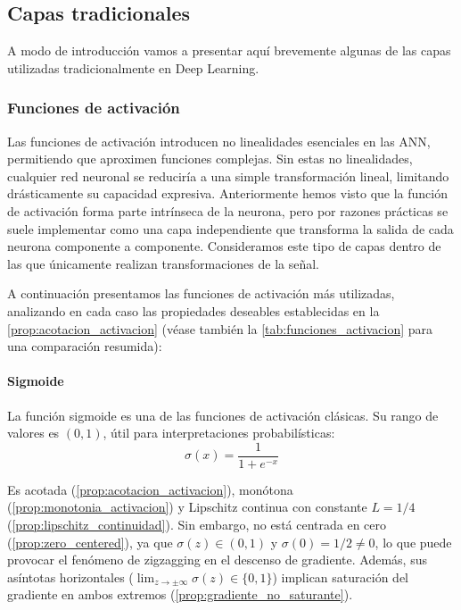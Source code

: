 \subsection{Capas tradicionales}

A modo de introducción vamos a presentar aquí brevemente algunas de las capas utilizadas tradicionalmente en Deep Learning.

\subsubsection{Funciones de activación}\label{subsubsec:funciones_activacion_capas}

Las funciones de activación introducen no linealidades esenciales en las \gls{ANN}, permitiendo que aproximen funciones complejas. Sin estas no linealidades, cualquier red neuronal se reduciría a una simple transformación lineal, limitando drásticamente su capacidad expresiva. Anteriormente hemos visto que la función de activación forma parte intrínseca de la neurona, pero por razones prácticas se suele implementar como una capa independiente que transforma la salida de cada neurona componente a componente. Consideramos este tipo de capas dentro de las que únicamente realizan transformaciones de la señal.

A continuación presentamos las funciones de activación más utilizadas, analizando en cada caso las propiedades deseables establecidas en la \autoref{prop:acotacion_activacion} (véase también la \autoref{tab:funciones_activacion} para una comparación resumida):

\paragraph{Sigmoide}

La función sigmoide es una de las funciones de activación clásicas. Su rango de valores es $(0, 1)$, útil para interpretaciones probabilísticas:
\[
\sigma(x) = \frac{1}{1 + e^{-x}}
\]

Es acotada (\autoref{prop:acotacion_activacion}), monótona (\autoref{prop:monotonia_activacion}) y Lipschitz continua con constante $L = 1/4$ (\autoref{prop:lipschitz_continuidad}). Sin embargo, no está centrada en cero (\autoref{prop:zero_centered}), ya que $\sigma(z) \in (0,1)$ y $\sigma(0) = 1/2 \neq 0$, lo que puede provocar el fenómeno de zigzagging en el descenso de gradiente. Además, sus asíntotas horizontales ($\lim_{z\to\pm\infty}\sigma(z) \in \{0,1\}$) implican saturación del gradiente en ambos extremos (\autoref{prop:gradiente_no_saturante}).

